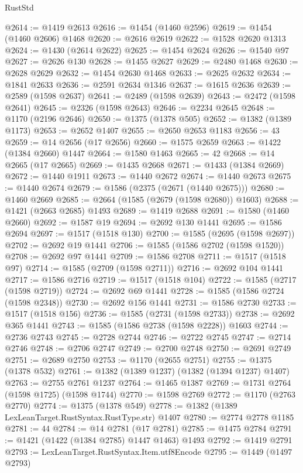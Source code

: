 \begin{lexlean}{RustStd}
\begin{coremodule}
@2614 := @1419 @2613
@2616 := @1454 (@1460 @2596)
@2619 := @1454 (@1460 @2606) @1468
@2620 := @2616 @2619
@2622 := @1528 @2620 @1313
@2624 := @1430 (@2614 @2622)
@2625 := @1454 @2624
@2626 := @1540 @97
@2627 := @2626 @130
@2628 := @1455 @2627
@2629 := @2480 @1468
@2630 := @2628 @2629
@2632 := @1454 @2630 @1468
@2633 := @2625 @2632
@2634 := @1841 @2633
@2636 := @2591 @2634 @1346
@2637 := @1615 @2636
@2639 := @2589 (@1598 @2637)
@2641 := @2489 (@1598 @2639)
@2643 := @2472 (@1598 @2641)
@2645 := @2326 (@1598 @2643)
@2646 := @2234 @2645
@2648 := @1170 (@2196 @2646)
@2650 := @1375 (@1378 @505)
@2652 := @1382 (@1389 @1173)
@2653 := @2652 @1407
@2655 := @2650 @2653 @1183
@2656 := 43
@2659 := @14 @2656 (@17 @2656)
@2660 := @1575 @2659
@2663 := @1422 (@1384 @2660) @1447
@2664 := @1580 @1463
@2665 := 42
@2668 := @14 @2665 (@17 @2665)
@2669 := @1435 @2668
@2671 := @1433 (@1384 @2669)
@2672 := @1440 @1911
@2673 := @1440 @2672
@2674 := @1440 @2673
@2675 := @1440 @2674
@2679 := @1586 (@2375 (@2671 (@1440 @2675)))
@2680 := @1460 @2669
@2685 := @2664 (@1585 (@2679 (@1598 @2680)) @1603)
@2688 := @1421 (@2663 @2685) @1493
@2689 := @1419 @2688
@2691 := @1580 (@1460 @2660)
@2692 := @1587 @19
@2694 := @2692 @130 @1441
@2695 := @1586 @2694
@2697 := @1517 (@1518 @130)
@2700 := @1585 (@2695 (@1598 @2697))
@2702 := @2692 @19 @1441
@2706 := @1585 (@1586 @2702 (@1598 @1520))
@2708 := @2692 @97 @1441
@2709 := @1586 @2708
@2711 := @1517 (@1518 @97)
@2714 := @1585 (@2709 (@1598 @2711))
@2716 := @2692 @104 @1441
@2717 := @1586 @2716
@2719 := @1517 (@1518 @104)
@2722 := @1585 (@2717 (@1598 @2719))
@2724 := @2692 @69 @1441
@2728 := @1585 (@1586 @2724 (@1598 @2348))
@2730 := @2692 @156 @1441
@2731 := @1586 @2730
@2733 := @1517 (@1518 @156)
@2736 := @1585 (@2731 (@1598 @2733))
@2738 := @2692 @365 @1441
@2743 := @1585 (@1586 @2738 (@1598 @2228)) @1603
@2744 := @2736 @2743
@2745 := @2728 @2744
@2746 := @2722 @2745
@2747 := @2714 @2746
@2748 := @2706 @2747
@2749 := @2700 @2748
@2750 := @2691 @2749
@2751 := @2689 @2750
@2753 := @1170 (@2655 @2751)
@2755 := @1375 (@1378 @532)
@2761 := @1382 (@1389 @1237) (@1382 (@1394 @1237) @1407)
@2763 := @2755 @2761 @1237
@2764 := @1465 @1387
@2769 := @1731 @2764 (@1598 @1725) (@1598 @1744)
@2770 := @1598 @2769
@2772 := @1170 (@2763 @2770)
@2774 := @1375 (@1378 @549)
@2778 := @1382 (@1389 LexLeanTarget.RustSyntax.RustType.str) @1407
@2780 := @2774 @2778 @1185
@2781 := 44
@2784 := @14 @2781 (@17 @2781)
@2785 := @1475 @2784
@2791 := @1421 (@1422 (@1384 @2785) @1447 @1463) @1493
@2792 := @1419 @2791
@2793 := LexLeanTarget.RustSyntax.Item.utf8Encode
@2795 := @1449 (@1497 @2793)

\end{coremodule}
\end{lexlean}
